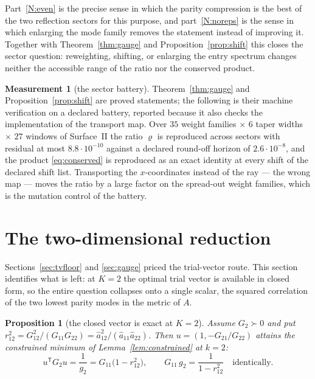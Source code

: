 \documentclass[11pt,a4paper]{article}
\theoremstyle{plain}
\newtheorem{proposition}[theorem]{Proposition}
\theoremstyle{definition}
\newtheorem{measurement}[theorem]{Measurement}
\newcommand{\T}{\mathsf{T}}
\newcommand{\PD}{\succ 0}
\newcommand{\ah}{\widehat{a}}
\begin{document}
Part~\ref{N:even} is the precise sense in which the parity compression is the
best of the two reflection sectors for this purpose, and part~\ref{N:noreps} is
the sense in which enlarging the mode family removes the statement instead of
improving it. Together with Theorem~\ref{thm:gauge} and
Proposition~\ref{prop:shift} this closes the sector question: reweighting,
shifting, or enlarging the entry spectrum changes neither the accessible range
of the ratio nor the conserved product.

\begin{measurement}[the sector battery]
\label{meas:battery}
Theorem~\ref{thm:gauge} and Proposition~\ref{prop:shift} are proved statements;
the following is their machine verification on a declared battery, reported
because it also checks the implementation of the transport map. Over
$35$ weight families $\times$ $6$ taper widths $\times$ $27$ windows of
Surface~II the ratio $\varrho$ is reproduced across sectors with residual at
most $8.8\cdot10^{-10}$ against a declared round-off horizon of
$2.6\cdot10^{-8}$, and the product \eqref{eq:conserved} is reproduced as an
exact identity at every shift of the declared shift list. Transporting the
$x$-coordinates instead of the ray --- the wrong map --- moves the ratio by a
large factor on the spread-out weight families, which is the mutation control of
the battery.
\end{measurement}

\section{The two-dimensional reduction}
\label{sec:twodim}

Sections~\ref{sec:tvfloor} and \ref{sec:gauge} priced the trial-vector route.
This section identifies what is left: at $K=2$ the optimal trial vector is
available in closed form, so the entire question collapses onto a single scalar,
the squared correlation of the two lowest parity modes in the metric of $A$.

\begin{proposition}[the closed vector is exact at $K=2$]
\label{prop:K2}
Assume $G_2\PD$ and put $r_{12}^{2}=G_{12}^{2}/(G_{11}G_{22})
=\ah_{12}^{2}/(\ah_{11}\ah_{22})$. Then $u=(1,-G_{21}/G_{22})$ attains the
constrained minimum of Lemma~\ref{lem:constrained} at $k=2$:
\begin{equation}
\label{eq:K2}
  u^{\T}G_2u=\frac1{g_2}=G_{11}\bigl(1-r_{12}^{2}\bigr),
  \qquad
  G_{11}\,g_2=\frac1{1-r_{12}^{2}}\quad\text{identically}.
\end{equation}
\end{proposition}
\end{document}
